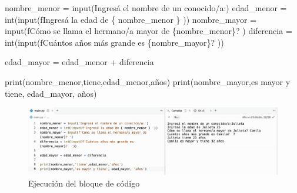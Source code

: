 \documentclass[
  letterpaper,
  DIV=11,
  numbers=noendperiod]{scrreprt}
\newenvironment{Shaded}{\begin{snugshade}}{\end{snugshade}}
\newcommand{\BuiltInTok}[1]{\textcolor[rgb]{0.00,0.23,0.31}{#1}}
\newcommand{\NormalTok}[1]{\textcolor[rgb]{0.00,0.23,0.31}{#1}}
\newcommand{\OperatorTok}[1]{\textcolor[rgb]{0.37,0.37,0.37}{#1}}
\newcommand{\SpecialCharTok}[1]{\textcolor[rgb]{0.37,0.37,0.37}{#1}}
\newcommand{\SpecialStringTok}[1]{\textcolor[rgb]{0.13,0.47,0.30}{#1}}
\newcommand{\StringTok}[1]{\textcolor[rgb]{0.13,0.47,0.30}{#1}}
\begin{document}
\begin{Shaded}
\begin{Highlighting}[]
\NormalTok{nombre\_menor }\OperatorTok{=} \BuiltInTok{input}\NormalTok{(}\StringTok{\textquotesingle{}Ingresá el nombre de un conocido/a:\textquotesingle{}}\NormalTok{)}
\NormalTok{edad\_menor }\OperatorTok{=} \BuiltInTok{int}\NormalTok{(}\BuiltInTok{input}\NormalTok{(}\SpecialStringTok{f\textquotesingle{}Ingresá la edad de }\SpecialCharTok{\{}\NormalTok{ nombre\_menor }\SpecialCharTok{\}}\SpecialStringTok{ \textquotesingle{}}\NormalTok{))}
\NormalTok{nombre\_mayor }\OperatorTok{=} \BuiltInTok{input}\NormalTok{(}\SpecialStringTok{f\textquotesingle{}Cómo se llama el hermano/a mayor de }\SpecialCharTok{\{}\NormalTok{nombre\_menor}\SpecialCharTok{\}}\SpecialStringTok{? \textquotesingle{}}\NormalTok{)}
\NormalTok{diferencia }\OperatorTok{=} \BuiltInTok{int}\NormalTok{(}\BuiltInTok{input}\NormalTok{(}\SpecialStringTok{f\textquotesingle{}Cuántos años más grande es }\SpecialCharTok{\{}\NormalTok{nombre\_mayor}\SpecialCharTok{\}}\SpecialStringTok{?  \textquotesingle{}}\NormalTok{))}

\NormalTok{edad\_mayor }\OperatorTok{=}\NormalTok{ edad\_menor }\OperatorTok{+}\NormalTok{ diferencia}

\BuiltInTok{print}\NormalTok{(nombre\_menor,}\StringTok{\textquotesingle{}tiene\textquotesingle{}}\NormalTok{,edad\_menor,}\StringTok{\textquotesingle{}años\textquotesingle{}}\NormalTok{)}
\BuiltInTok{print}\NormalTok{(nombre\_mayor,}\StringTok{\textquotesingle{}es mayor y tiene\textquotesingle{}}\NormalTok{, edad\_mayor, }\StringTok{\textquotesingle{}años\textquotesingle{}}\NormalTok{)}
\end{Highlighting}
\end{Shaded}

\begin{figure}

{\centering \includegraphics{./imgs/unidad_2/ejemplo_casteo.png}

}

\caption{Ejecución del bloque de código}

\end{figure}
\end{document}
